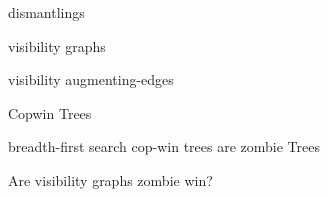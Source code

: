 
dismantlings

visibility graphs

visibility augmenting-edges

Copwin Trees

breadth-first search cop-win trees are zombie Trees

Are visibility graphs zombie win?
